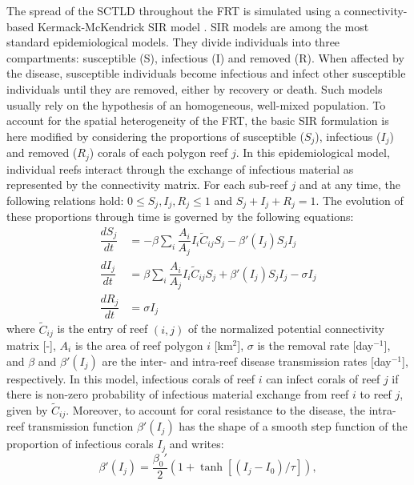 \documentclass[utf8]{frontiersSCNS}
\begin{document}
The spread of the SCTLD throughout the FRT is simulated using a connectivity-based Kermack-McKendrick SIR model \citep{brauer2008compartmental}. SIR models are among the most standard epidemiological models. They divide individuals into three compartments: susceptible (S), infectious (I) and removed (R). When affected by the disease, susceptible individuals become infectious and infect other susceptible individuals until they are removed, either by recovery or death. Such models usually rely on the hypothesis of an homogeneous, well-mixed population. To account for the spatial heterogeneity of the FRT, the basic SIR formulation is here modified by considering the proportions of susceptible ($S_j$), infectious ($I_j$) and removed ($R_j$) corals of each polygon reef $j$. In this epidemiological model, individual reefs interact through the exchange of infectious material as represented by the connectivity matrix. For each sub-reef $j$ and at any time, the following relations hold: $0\leq S_j,I_j,R_j\leq 1$ and $S_j+I_j+R_j=1$. The evolution of these proportions through time is governed by the following equations:
\begin{equation}
    \begin{aligned}
        \dfrac{dS_j}{dt} &= -\beta\sum_i\dfrac{A_i}{A_j}I_i\tilde{C}_{ij}S_j - \beta'(I_j)S_jI_j \\
        \dfrac{dI_j}{dt} &= \beta\sum_i\dfrac{A_i}{A_j}I_i\tilde{C}_{ij}S_j + \beta'(I_j)S_jI_j - \sigma I_j \\
        \dfrac{dR_j}{dt} &= \sigma I_j
    \end{aligned}\label{eq:epidemio}
\end{equation}
where $\tilde{C}_{ij}$ is the entry of reef $(i,j)$ of the normalized potential connectivity matrix [-], $A_i$ is the area of reef polygon $i$ [km$^2$], $\sigma$ is the removal rate [day$^{-1}$], and $\beta$ and $\beta'(I_j)$ are the inter- and intra-reef disease transmission rates [day$^{-1}$], respectively. In this model, infectious corals of reef $i$ can infect corals of reef $j$ if there is non-zero probability of infectious material exchange from reef $i$ to reef $j$, given by $\tilde{C}_{ij}$. Moreover, to account for coral resistance to the disease, the intra-reef transmission function $\beta'(I_j)$ has the shape of a smooth step function of the proportion of infectious corals $I_j$ and writes:
\begin{equation}
    \beta'(I_j) = \dfrac{\beta_0'}{2}(1+\tanh[(I_j-I_0)/\tau]),\label{eq:beta}
\end{equation}
\end{document}
